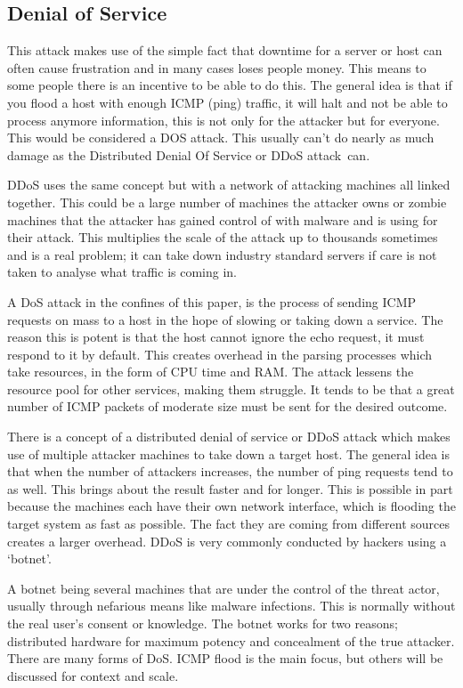 \subsection{Denial of Service}
This attack makes use of the simple fact that downtime for a server or host can often cause frustration and in many cases loses people money. This means to some people there is an incentive to be able to do this. The general idea is that if you flood a host with enough ICMP (ping) traffic, it will halt and not be able to process anymore information, this is not only for the attacker but for everyone. This would be considered a DOS attack. 
This usually can't do nearly as much damage as the Distributed Denial Of Service or DDoS attack can.

DDoS uses the same concept but with a network of attacking machines all linked together. This could be a large number of machines the attacker owns or zombie machines that the attacker has gained control of with malware and is using for their attack. This multiplies the scale of the attack up to thousands sometimes and is a real problem; it can take down industry 
standard servers if care is not taken to analyse what traffic is coming in.

A DoS attack in the confines of this paper, is the process of sending ICMP requests on mass to a host in the hope of slowing or taking down a service. The reason this is potent is that the host cannot ignore the echo request, it must respond to it by default. This creates overhead in the parsing processes which take resources, in the form of CPU time and RAM. The attack lessens the resource pool for other services, making them struggle. 
It tends to be that a great number of ICMP packets of moderate size must be sent for the desired outcome.

There is a concept of a distributed denial of service or DDoS attack which makes use of multiple attacker machines to take down a target host. The general idea is that when the number of attackers increases, the number of ping requests tend to as well. This brings about the result faster and for longer. This is possible in part because the machines each have their own network interface, which is flooding the target system as fast as possible. 
The fact they are coming from different sources creates a larger overhead. DDoS is very commonly conducted by hackers using a ‘botnet’. 

A botnet being several machines that are under the control of the threat actor, usually through nefarious means like malware infections. This is normally without the real user’s consent or knowledge. The botnet works for two reasons; distributed hardware for maximum potency and concealment of the true attacker. 
There are many forms of DoS. ICMP flood is the main focus, but others will be discussed for context and scale. 

